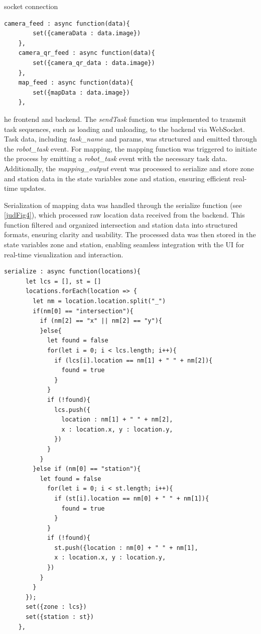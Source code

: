 \documentclass[../../main]{subfiles}
\begin{document}
\begin{codebox}[]{socket connection}
  \begin{verbatim}
camera_feed : async function(data){
        set({cameraData : data.image})
    },
    camera_qr_feed : async function(data){
        set({camera_qr_data : data.image})
    },
    map_feed : async function(data){
        set({mapData : data.image})
    },
\end{verbatim}
\end{codebox}
he frontend and backend. The \emph{sendTask} function was
implemented to transmit task sequences, such as loading and unloading,
to the backend via WebSocket. Task data, including \emph{task\_name} and
params, was structured and emitted through the \emph{robot\_task} event.
For mapping, the mapping function was triggered to initiate the process
by emitting a \emph{robot\_task} event with the necessary task data.
Additionally, the \emph{mapping\_output} event was processed to
serialize and store zone and station data in the state variables zone
and station, ensuring efficient real-time updates.

Serialization of mapping data was handled through the serialize function
(see \cref{judFig4}), which processed raw location data received from the
backend. This function filtered and organized intersection and station
data into structured formats, ensuring clarity and usability. The
processed data was then stored in the state variables zone and station,
enabling seamless integration with the UI for real-time visualization
and interaction.

\begin{codebox}[]{}
  \begin{verbatim}
serialize : async function(locations){
      let lcs = [], st = []
      locations.forEach(location => {
        let nm = location.location.split("_")
        if(nm[0] == "intersection"){
          if (nm[2] == "x" || nm[2] == "y"){ 
          }else{
            let found = false
            for(let i = 0; i < lcs.length; i++){
              if (lcs[i].location == nm[1] + " " + nm[2]){
                found = true
              }
            }
            if (!found){
              lcs.push({
                location : nm[1] + " " + nm[2],
                x : location.x, y : location.y,
              })
            }
          }
        }else if (nm[0] == "station"){
          let found = false
            for(let i = 0; i < st.length; i++){
              if (st[i].location == nm[0] + " " + nm[1]){
                found = true
              }
            }
            if (!found){
              st.push({location : nm[0] + " " + nm[1],
              x : location.x, y : location.y,
            })
          }
        }
      });
      set({zone : lcs})
      set({station : st})
    },
\end{verbatim}
\end{codebox}
\end{document}
